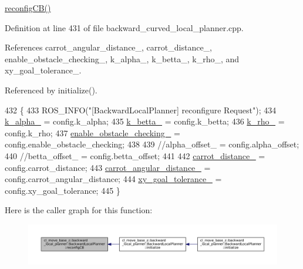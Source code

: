 \hyperlink{classcl__move__base__z_1_1backward__local__planner_1_1BackwardLocalPlanner_a62e4783adae03ce92190d855a021b91d}{reconfig\+C\+B()} 

Definition at line 431 of file backward\+\_\+curved\+\_\+local\+\_\+planner.\+cpp.



References carrot\+\_\+angular\+\_\+distance\+\_\+, carrot\+\_\+distance\+\_\+, enable\+\_\+obstacle\+\_\+checking\+\_\+, k\+\_\+alpha\+\_\+, k\+\_\+betta\+\_\+, k\+\_\+rho\+\_\+, and xy\+\_\+goal\+\_\+tolerance\+\_\+.



Referenced by initialize().


\begin{DoxyCode}
432         \{
433             ROS\_INFO(\textcolor{stringliteral}{"[BackwardLocalPlanner] reconfigure Request"});
434             \hyperlink{classcl__move__base__z_1_1backward__local__planner_1_1BackwardLocalPlanner_abf7a5a56de2ee41afba7e63c0628ec35}{k\_alpha\_} = config.k\_alpha;
435             \hyperlink{classcl__move__base__z_1_1backward__local__planner_1_1BackwardLocalPlanner_a9f257183d87f1d732cb7e404f09905ad}{k\_betta\_} = config.k\_betta;
436             \hyperlink{classcl__move__base__z_1_1backward__local__planner_1_1BackwardLocalPlanner_ad8a36184bfb011545c751109e23d3b98}{k\_rho\_} = config.k\_rho;
437             \hyperlink{classcl__move__base__z_1_1backward__local__planner_1_1BackwardLocalPlanner_a154043366660cc02ec758dda32817511}{enable\_obstacle\_checking\_} = config.enable\_obstacle\_checking;
438 
439             \textcolor{comment}{//alpha\_offset\_ = config.alpha\_offset;}
440             \textcolor{comment}{//betta\_offset\_ = config.betta\_offset;}
441 
442             \hyperlink{classcl__move__base__z_1_1backward__local__planner_1_1BackwardLocalPlanner_a0bbb80ce5bae865c4322869422803296}{carrot\_distance\_} = config.carrot\_distance;
443             \hyperlink{classcl__move__base__z_1_1backward__local__planner_1_1BackwardLocalPlanner_a63e30befa09c4a67cf55086923b760c7}{carrot\_angular\_distance\_} = config.carrot\_angular\_distance;
444             \hyperlink{classcl__move__base__z_1_1backward__local__planner_1_1BackwardLocalPlanner_aa4ec2c87947a3c08f8278eff052e7c8c}{xy\_goal\_tolerance\_} = config.xy\_goal\_tolerance;
445         \}
\end{DoxyCode}
Here is the caller graph for this function\+:
\nopagebreak
\begin{figure}[H]
\begin{center}
\leavevmode
\includegraphics[width=350pt]{classcl__move__base__z_1_1backward__local__planner_1_1BackwardLocalPlanner_a62e4783adae03ce92190d855a021b91d_icgraph}
\end{center}
\end{figure}

